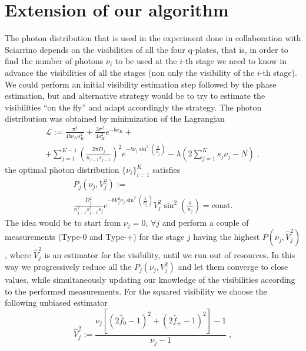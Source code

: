 \documentclass[aps, pra, 10pt, twocolumn, superscriptaddress,floatfix]{revtex4-1}
\begin{document}
\section{Extension of our algorithm}
%
The photon distribution that is used in the experiment done in collaboration with Sciarrino depends on the visibilities of all the four q-plates, that is, in order to find the number of photons $\nu_i$ to be used at the $i$-th stage we need to know in advance the visibilities of all the stages (non only the visibility of the $i$-th stage). We could perform an initial visibility estimation step followed by the phase estimation, but and alternative strategy would be to try to estimate the visibilities ``on the fly'' and adapt accordingly the strategy. The photon distribution was obtained by minimization of the Lagrangian
%
\begin{multline}
	\mathcal{L} := \frac{\pi^2}{4 b \nu_K s_K^2} + \frac{3 \pi^2}{4 s_K^2} e^{-b \nu_K} + \\  + \sum_{j=1}^{K-1} \left( \frac{2 \pi D_j}{n_{j-1} s_{j-1}}\right)^2 e^{-b\nu_j \sin^2 \left( \frac{\pi}{n_j} \right)} - \lambda \left( 2 \sum_{j=1}^{K} s_j \nu_j - N \right)\; ,
	\label{eq:lagrangianExplicited}
\end{multline}
%
the optimal photon distribution $\lbrace \nu_i \rbrace_{i=1}^K$ satisfies
%
\begin{multline}
	P_j(\nu_j, V^2_j) := \\ \frac{D_j^2}{n_{j-1}^2 s_{j-1}^2 s_j} e^{-b V_j^2 \nu_j \sin^2 \left( \frac{\pi}{n_j} \right)} V_j^2 \sin^2 \left( \frac{\pi}{n_j} \right) = \text{const.}
\end{multline}
%
The idea would be to start from $\nu_j = 0, \, \forall j$ and perform a couple of measurements (Type-$0$ and Type-$+$) for the stage $j$ having the highest $P(\nu_j, \hat{V}^2_j)$, where $\hat{V}^2_j$ is an estimator for the visibility, until we run out of resources. In this way we progressively reduce all the $P_j(\nu_j, V^2_j)$ and let them converge to close values, while simultaneously updating our knowledge of the visibilities according to the performed measurements. For the squared visibility we choose the following unbiased estimator
%
\begin{equation}
	\hat{V}^2_j := \frac{\nu_j \left[ (2 \hat{f}_0 - 1)^2 + (2 \hat{f}_+-1)^2\right] - 1}{\nu_j -1} \; ,
\end{equation}
%
\end{document}
